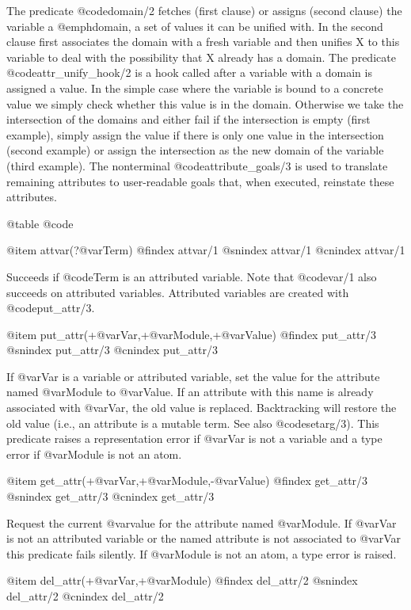 {{{{{{{{The predicate @code{domain/2} fetches (first clause) or assigns
(second clause) the variable a @emph{domain}, a set of values it can
be unified with.  In the second clause first associates the domain
with a fresh variable and then unifies X to this variable to deal
with the possibility that X already has a domain. The
predicate @code{attr_unify_hook/2} is a hook called after a variable with
a domain is assigned a value.  In the simple case where the variable
is bound to a concrete value we simply check whether this value is in
the domain. Otherwise we take the intersection of the domains and either
fail if the intersection is empty (first example), simply assign the
value if there is only one value in the intersection (second example) or
assign the intersection as the new domain of the variable (third
example). The nonterminal @code{attribute_goals/3} is used to translate
remaining attributes to user-readable goals that, when executed, reinstate
these attributes.

@table @code

@item attvar(?@var{Term})
@findex attvar/1
@snindex attvar/1
@cnindex attvar/1

Succeeds if @code{Term} is an attributed variable. Note that @code{var/1} also
succeeds on attributed variables.  Attributed variables are created with
@code{put_attr/3}.

@item put_attr(+@var{Var},+@var{Module},+@var{Value})
@findex put_attr/3
@snindex put_attr/3
@cnindex put_attr/3

If @var{Var} is a variable or attributed variable, set the value for the
attribute named @var{Module} to @var{Value}. If an attribute with this
name is already associated with @var{Var}, the old value is replaced.
Backtracking will restore the old value (i.e., an attribute is a mutable
term. See also @code{setarg/3}). This predicate raises a representation error if
@var{Var} is not a variable and a type error if @var{Module} is not an atom.

@item get_attr(+@var{Var},+@var{Module},-@var{Value})
@findex get_attr/3
@snindex get_attr/3
@cnindex get_attr/3

Request the current @var{value} for the attribute named @var{Module}.  If
@var{Var} is not an attributed variable or the named attribute is not
associated to @var{Var} this predicate fails silently.  If @var{Module}
is not an atom, a type error is raised.

@item del_attr(+@var{Var},+@var{Module})
@findex del_attr/2
@snindex del_attr/2
@cnindex del_attr/2

}}}}}}}}
